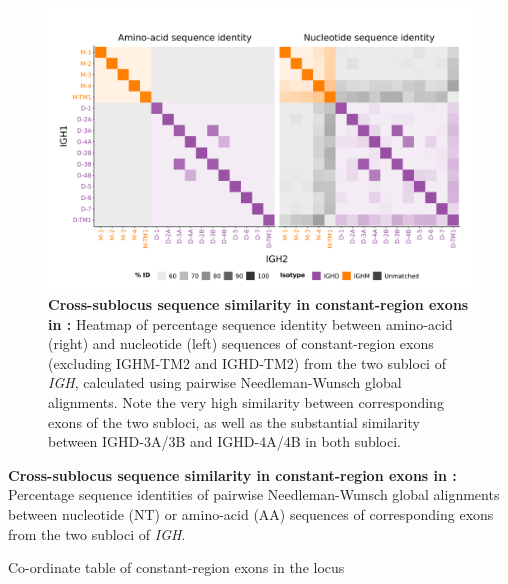 	\begin{figure}
	\centering
	\includegraphics[width = \textwidth]{_Figures/png/nfu-ch-aln}
	\caption[Cross-sublocus sequence similarity in constant-region exons in \Nfu \textit{IGH}]{\textbf{Cross-sublocus sequence similarity in constant-region exons in \Nfu:} Heatmap of percentage sequence identity between amino-acid (right) and nucleotide (left) sequences of constant-region exons (excluding IGHM-TM2 and IGHD-TM2) from the two subloci of \Nfu \textit{IGH}, calculated using pairwise Needleman-Wunsch global alignments. Note the very high similarity between corresponding exons of the two subloci, as well as the substantial similarity between IGHD-3A/3B and IGHD-4A/4B in both subloci.}
	\label{fig:nfu-ch-aln}
	\end{figure}
	
	\begin{table}\centering
		\caption[Cross-sublocus sequence similarity between corresponding constant-region exons in \Nfu \textit{IGH}]{\textbf{Cross-sublocus sequence similarity in constant-region exons in \Nfu:} Percentage sequence identities of pairwise Needleman-Wunsch global alignments between nucleotide (NT) or amino-acid (AA) sequences of corresponding exons from the two subloci of \Nfu \textit{IGH}.}
	
	\label{tab:nfu-ch-aln}
	\end{table}
	
\begin{table}\centering
    \caption{Co-ordinate table of constant-region exons in the \nfu \igh{} locus}
    	
    \label{tab:nfu-ch-coords}
\end{table}

